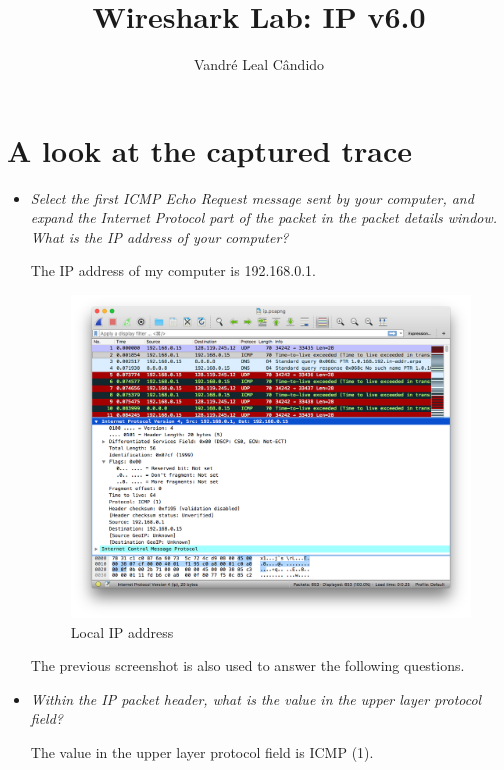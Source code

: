 \documentclass[11pt]{article}
\begin{document}
%
\author{Vandré Leal Cândido}
\title{Wireshark Lab: IP v6.0}
\maketitle

\section{A look at the captured trace}

\begin{itemize}
	\setlength\itemsep{.5cm}

	\item
		\textit{Select the first ICMP Echo Request message sent by your computer, and expand the Internet Protocol part of the packet in the packet details window. What is the IP address of your computer?}
		\par The IP address of my computer is 192.168.0.1.
		
		\begin{figure}[H]
		\centering
		\caption{Local IP address}
		\includegraphics[width=400px]{01}
		\end{figure}
		
		\par The previous screenshot is also used to answer the following questions.

	\item
		\textit{Within the IP packet header, what is the value in the upper layer protocol field?}
		\par The value in the upper layer protocol field is ICMP (1).


\end{itemize}
\end{document}
